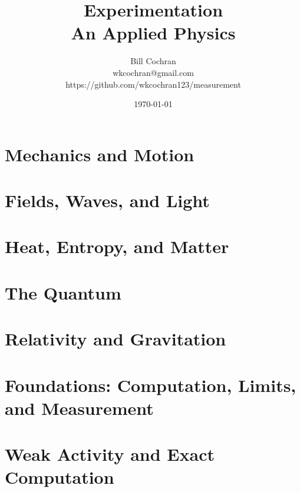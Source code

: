 \documentclass[12pt,oneside]{book}
\begin{document}
\title{Experimentation\\[0.4em]\large An Applied Physics}
\author{Bill Cochran\\wkcochran@gmail.com\\https://github.com/wkcochran123/measurement}
\date{\today}
\maketitle

\frontmatter
\onehalfspacing
\tableofcontents





\mainmatter
\part{Mechanics and Motion}




\part{Fields, Waves, and Light}




\part{Heat, Entropy, and Matter}





\part{The Quantum}






\part{Relativity and Gravitation}




\part{Foundations: Computation, Limits, and Measurement}







\part{Weak Activity and Exact Computation}






\backmatter
\end{document}

